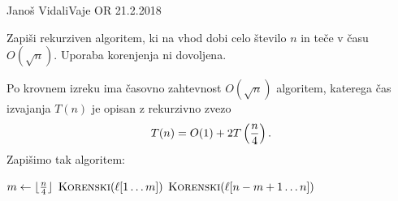 \begin{naloga}{Janoš Vidali}{Vaje OR 21.2.2018}
\begin{vprasanje}
Zapiši rekurziven algoritem,
ki na vhod dobi celo število $n$ in teče v času $O(\sqrt{n})$.
Uporaba korenjenja ni dovoljena.
\end{vprasanje}

\begin{odgovor}
Po krovnem izreku ima časovno zahtevnost $O(\sqrt{n})$ algoritem,
katerega čas izvajanja $T(n)$ je opisan z rekurzivno zvezo
$$
T(n) = O(1) + 2T\left({n \over 4}\right) .
$$
Zapišimo tak algoritem:
\begin{small}
\begin{algorithmic}
        \State $m \gets \lfloor {n \over 4} \rfloor$
        \State $\text{\sc Korenski}(\ell[1 \dots m])$
        \State $\text{\sc Korenski}(\ell[n-m+1 \dots n])$
    \EndIf
\EndFunction
\end{algorithmic}
\end{small}
\end{odgovor}
\end{naloga}


